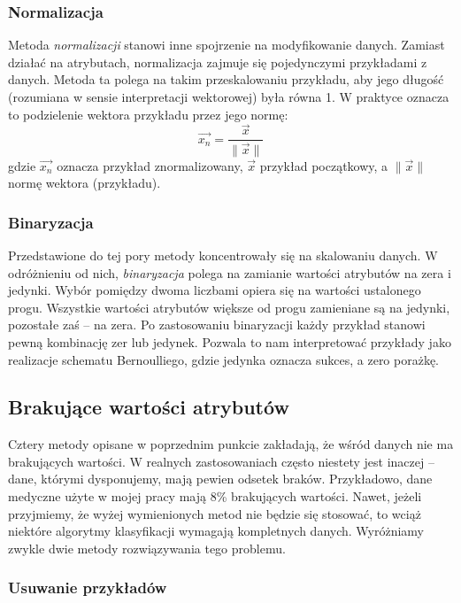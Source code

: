 \documentclass[../thesis.tex]{subfiles}
\begin{document}
\subsubsection{Normalizacja}

Metoda \emph{normalizacji} stanowi inne spojrzenie na modyfikowanie danych. Zamiast działać na atrybutach, normalizacja zajmuje się pojedynczymi przykładami z danych. Metoda ta polega na takim przeskalowaniu przykładu, aby jego długość (rozumiana w sensie interpretacji wektorowej) była równa 1. W praktyce oznacza to podzielenie wektora przykładu przez jego normę:
\[\vec{x_n} = \frac{\vec{x}}{\|\vec{x}\|}\]
gdzie $\vec{x_n}$ oznacza przykład znormalizowany, $\vec{x}$ przykład początkowy, a $\|\vec{x}\|$ normę wektora (przykładu).

\subsubsection{Binaryzacja}

Przedstawione do tej pory metody koncentrowały się na skalowaniu danych. W odróżnieniu od nich, \emph{binaryzacja} polega na zamianie wartości atrybutów na zera i jedynki. Wybór pomiędzy dwoma liczbami  opiera się na wartości ustalonego progu. Wszystkie wartości atrybutów większe od progu zamieniane są na jedynki, pozostałe zaś – na zera. Po zastosowaniu binaryzacji każdy przykład stanowi pewną kombinację zer lub jedynek. Pozwala to nam interpretować przykłady jako realizacje schematu Bernoulliego, gdzie jedynka oznacza sukces, a zero porażkę.

\subsection{Brakujące wartości atrybutów}

Cztery metody opisane w poprzednim punkcie zakładają, że wśród danych nie ma brakujących wartości. W realnych zastosowaniach często niestety jest inaczej – dane, którymi dysponujemy, mają  pewien odsetek braków. Przykładowo, dane medyczne użyte w mojej pracy mają 8\% brakujących wartości. Nawet, jeżeli przyjmiemy, że wyżej wymienionych metod nie będzie się stosować, to wciąż niektóre algorytmy klasyfikacji wymagają kompletnych danych. Wyróżniamy zwykle dwie metody rozwiązywania tego problemu.

\subsubsection{Usuwanie przykładów}
\end{document}
